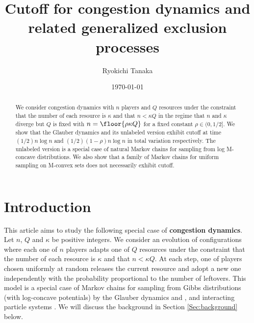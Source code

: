 \documentclass[12pt, reqno]{amsart}
\begin{document}
\title[Cutoff for congestion dynamics]
      {Cutoff for congestion dynamics and related generalized exclusion processes}
\author{Ryokichi Tanaka}
\address{Department of Mathematics, Kyoto University, Kyoto 606-8502 JAPAN}
\date{\today}


\maketitle

\begin{abstract}
We consider congestion dynamics with $n$ players and $Q$ resources under the constraint that the number of each resource is $\kappa$ and that $n<\kappa Q$ in the regime that
 $n$ and $\kappa$ diverge but $Q$ is fixed with $n=\floor{\rho \kappa Q}$ for a fixed constant $\rho \in (0, 1/2]$.
 We show that the Glauber dynamics and its unlabeled version exhibit cutoff at time $(1/2)n \log n$ and $(1/2)(1-\rho)n\log n$ in total variation respectively.
 The unlabeled version is a special case of natural Markov chains for sampling from log M-concave distributions.
 We also show that a family of Markov chains for uniform sampling on M-convex sets does not necessarily exhibit cutoff.
\end{abstract}

\section{Introduction}\label{Sec:introduction}

This article aims to study the following special case of {\bf congestion dynamics}.
Let $n$, $Q$ and $\kappa$ be positive integers.
We consider an evolution of configurations where each one of $n$ players adapts one of $Q$ resources under the constraint that the number of each resource is $\kappa$ and that $n<\kappa Q$.
At each step, one of players chosen uniformly at random releases the current resource and adopt a new one independently with the probability proportional to the number of leftovers.
This model is a special case of Markov chains for sampling from Gibbs distributions (with log-concave potentials) by the Glauber dynamics \cite{logconcaveIV} and \cite{Kleer},
and interacting particle systems \cite{KipnisLandim}.
We will discuss the background in Section \ref{Sec:background} below.
\end{document}
